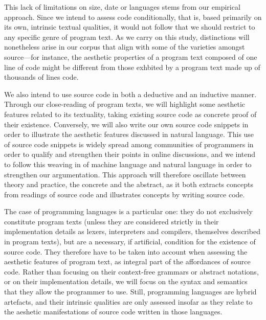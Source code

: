 This lack of limitations on size, date or languages stems from our empirical approach. Since we intend to assess code conditionally, that is, based primarily on its own, intrinsic textual qualities, it would not follow that we should restrict to any specific genre of program text. As we carry on this study, distinctions will nonetheless arise in our corpus that align with some of the varieties amongst source—for instance, the aesthetic properties of a program text composed of one line of code might be different from those exhbited by a program text made up of thousands of lines code.

We also intend to use source code in both a deductive and an inductive manner. Through our close-reading of program texts, we will highlight some aesthetic features related to its textuality, taking existing source code as concrete proof of their existence. Conversely, we will also write our own source code snippets in order to illustrate the aesthetic features discussed in natural language. This use of source code snippets is widely spread among communities of programmers in order to qualify and strengthen their points in online discussions, and we intend to follow this weaving in of machine language and natural language in order to strengthen our argumentation. This approach will therefore oscillate between theory and practice, the concrete and the abstract, as it both extracts concepts from readings of source code and illustrates concepts by writing source code.

The case of programming languages is a particular one: they do not exclusively constitute program texts (unless they are considered strictly in their implementation details as lexers, interpreters and compilers, themselves described in program texts), but are a necessary, if artificial, condition for the existence of source code. They therefore have to be taken into account when assessing the aesthetic features of program text, as integral part of the affordances of source code. Rather than focusing on their context-free grammars or abstract notations, or on their implementation details, we will focus on the syntax and semantics that they allow the programmer to use. Still, programming languages are hybrid artefacts, and their intrinsic qualities are only assessed insofar as they relate to the aeshetic manifestations of source code written in those languages.

